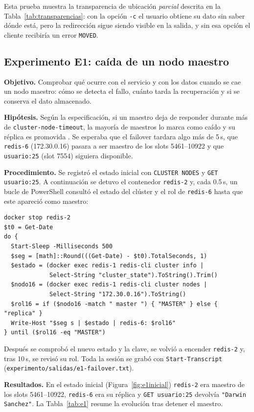 \documentclass[11pt,a4paper]{article}
\begin{document}
Esta prueba muestra la transparencia de ubicación \emph{parcial} descrita en
la Tabla~\ref{tab:transparencias}: con la opción \texttt{-c} el usuario
obtiene su dato sin saber dónde está, pero la redirección sigue siendo
visible en la salida, y sin esa opción el cliente recibiría un error
\texttt{MOVED}.

\subsection{Experimento E1: caída de un nodo maestro}

\textbf{Objetivo.} Comprobar qué ocurre con el servicio y con los datos cuando
se cae un nodo maestro: cómo se detecta el fallo, cuánto tarda la
recuperación y si se conserva el dato almacenado.

\textbf{Hipótesis.} Según la especificación, si un maestro deja de responder
durante más de \texttt{cluster-node-timeout}, la mayoría de maestros lo marca
como caído y su réplica es promovida \cite{redis2026clusterspec}. Se esperaba
que el failover tardara algo más de 5\,s, que \texttt{redis-6} (172.30.0.16)
pasara a ser maestro de los slots 5461--10922 y que \texttt{usuario:25}
(slot 7554) siguiera disponible.

\textbf{Procedimiento.} Se registró el estado inicial con
\texttt{CLUSTER NODES} y \texttt{GET usuario:25}. A continuación se detuvo el
contenedor \texttt{redis-2} y, cada 0.5\,s, un bucle de PowerShell consultó
el estado del clúster y el rol de \texttt{redis-6} hasta que este apareció
como maestro:

\begin{lstlisting}
docker stop redis-2
$t0 = Get-Date
do {
  Start-Sleep -Milliseconds 500
  $seg = [math]::Round(((Get-Date) - $t0).TotalSeconds, 1)
  $estado = (docker exec redis-1 redis-cli cluster info |
             Select-String "cluster_state").ToString().Trim()
  $nodo16 = (docker exec redis-1 redis-cli cluster nodes |
             Select-String "172.30.0.16").ToString()
  $rol16 = if ($nodo16 -match " master ") { "MASTER" } else { "replica" }
  Write-Host "$seg s | $estado | redis-6: $rol16"
} until ($rol16 -eq "MASTER")
\end{lstlisting}

Después se comprobó el nuevo estado y la clave, se volvió a encender
\texttt{redis-2} y, tras 10\,s, se revisó su rol. Toda la sesión se grabó con
\texttt{Start-Transcript} (\texttt{experimento/salidas/e1-failover.txt}).

\textbf{Resultados.} En el estado inicial (Figura~\ref{fig:e1inicial})
\texttt{redis-2} era maestro de los slots 5461--10922, \texttt{redis-6} era
su réplica y \texttt{GET usuario:25} devolvía \texttt{"Darwin Sanchez"}. La
Tabla~\ref{tab:e1} resume la evolución tras detener el maestro.
\end{document}
